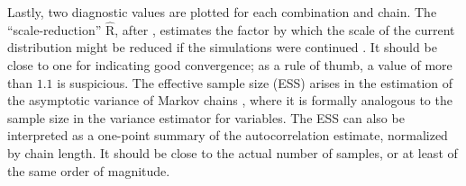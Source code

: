 Lastly, two diagnostic values are plotted for each combination and chain.  The
\enquote{scale-reduction} \(\widehat{\mathrm{R}}\), after \textcite{gelman1992inference}, estimates
the factor by which the scale of the current distribution might be reduced if the simulations were
continued \parencite[see][p. 285]{gelman2020bayesian}.  It should be close to one for indicating
good convergence; as a rule of thumb, a value of more than \(1.1\) is suspicious.  The effective
sample size (ESS) arises in the estimation of the asymptotic variance of Markov chains
\parencite[][section 7.2]{vihola2020lectures}, where it is formally analogous to the sample size in
the variance estimator for \iid{} variables.  The ESS can also be interpreted as a one-point summary
of the autocorrelation estimate, normalized by chain length.  It should be close to the actual
number of samples, or at least of the same order of magnitude.


